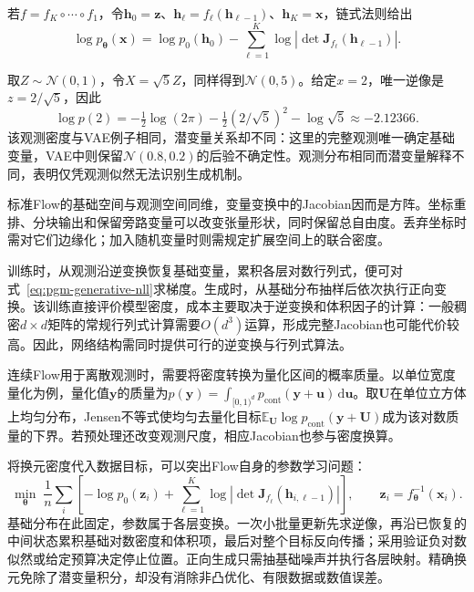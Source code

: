 若$f=f_K\circ\cdots\circ f_1$，令$\bm{h}_0=\bm{z}$、$\bm{h}_{\ell}=f_{\ell}(\bm{h}_{\ell-1})$、$\bm{h}_K=\bm{x}$，链式法则给出
\begin{equation}
  \label{eq:pgm-generative-flow-composition}
  \log p_{\bm{\theta}}(\bm{x})
  =\log p_0(\bm{h}_0)
   -\sum_{\ell=1}^{K}
      \log|\det\bm{J}_{f_{\ell}}(\bm{h}_{\ell-1})|.
\end{equation}
\begin{example}[用缩放得到相同的一维密度]
  \label{ex:pgm-generative-gaussian-flow}
  取$Z\sim\mathcal{N}(0,1)$，令$X=\sqrt{5}Z$，同样得到$\mathcal{N}(0,5)$。给定$x=2$，唯一逆像是$z=2/\sqrt5$，因此
  \[
    \log p(2)=-\tfrac12\log(2\pi)
              -\tfrac12(2/\sqrt5)^2-\log\sqrt5
             \approx-2.12366.
  \]
  该观测密度与VAE例子相同，潜变量关系却不同：这里的完整观测唯一确定基础变量，VAE中则保留$\mathcal{N}(0.8,0.2)$的后验不确定性。观测分布相同而潜变量解释不同，表明仅凭观测似然无法识别生成机制。
\end{example}

标准Flow的基础空间与观测空间同维，变量变换中的Jacobian因而是方阵。坐标重排、分块输出和保留旁路变量可以改变张量形状，同时保留总自由度。丢弃坐标时需对它们边缘化；加入随机变量时则需规定扩展空间上的联合密度。


训练时，从观测沿逆变换恢复基础变量，累积各层对数行列式，便可对式~\eqref{eq:pgm-generative-nll}求梯度。生成时，从基础分布抽样后依次执行正向变换。该训练直接评价模型密度，成本主要取决于逆变换和体积因子的计算：一般稠密$d\times d$矩阵的常规行列式计算需要$O(d^3)$运算，形成完整Jacobian也可能代价较高。因此，网络结构需同时提供可行的逆变换与行列式算法。

连续Flow用于离散观测时，需要将密度转换为量化区间的概率质量。以单位宽度量化为例，量化值$\bm{y}$的质量为$p(\bm{y})=\int_{[0,1)^d}p_{\mathrm{cont}}(\bm{y}+\bm{u})\,\mathrm{d}\bm{u}$。取$\bm{U}$在单位立方体上均匀分布，Jensen不等式使均匀去量化目标$\mathbb{E}_{\bm{U}}\log p_{\mathrm{cont}}(\bm{y}+\bm{U})$成为该对数质量的下界。若预处理还改变观测尺度，相应Jacobian也参与密度换算。

将换元密度代入数据目标，可以突出Flow自身的参数学习问题：
\begin{equation}
  \label{eq:pgm-generative-flow-objective}
  \min_{\bm\theta}\;\frac1n\sum_i
  \left[-\log p_0(\bm z_i)
        +\sum_{\ell=1}^{K}\log\left|
             \det\bm J_{f_\ell}(\bm h_{i,\ell-1})\right|\right],
  \qquad \bm z_i=f_{\bm\theta}^{-1}(\bm x_i).
\end{equation}
基础分布在此固定，参数属于各层变换。一次小批量更新先求逆像，再沿已恢复的中间状态累积基础对数密度和体积项，最后对整个目标反向传播；采用验证负对数似然或给定预算决定停止位置。正向生成只需抽基础噪声并执行各层映射。精确换元免除了潜变量积分，却没有消除非凸优化、有限数据或数值误差。

